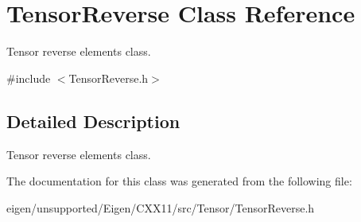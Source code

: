 \hypertarget{class_tensor_reverse}{}\section{Tensor\+Reverse Class Reference}
\label{class_tensor_reverse}


Tensor reverse elements class.  




{\ttfamily \#include $<$Tensor\+Reverse.\+h$>$}



\subsection{Detailed Description}
Tensor reverse elements class. 

The documentation for this class was generated from the following file\+:\begin{DoxyCompactItemize}
\item 
eigen/unsupported/\+Eigen/\+C\+X\+X11/src/\+Tensor/\+Tensor\+Reverse.\+h\end{DoxyCompactItemize}
